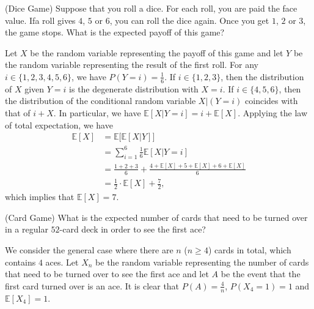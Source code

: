 \documentclass[12pt,letterpaper, onecolumn]{exam}
\begin{document}
\begin{questions}
        \question[](Dice Game) Suppose that you roll a dice. For each roll, you are paid the face value. Ifa roll gives $4$, $5$ or $6$, you can roll the dice again. Once you get $1$, $2$ or $3$, the game stops. What is the expected payoff of this game?
        \begin{solution}
            Let $X$ be the random variable representing the payoff of this game and let $Y$ be the random variable representing the result of the first roll. For any $i\in\{1,2,3,4,5,6\}$, we have $P(Y=i)=\frac{1}{6}$. If $i\in\{1,2,3\}$, then the distribution of $X$ given $Y=i$ is the degenerate distribution with $X=i$. If $i\in\{4,5,6\}$, then the distribution of the conditional random variable $X|(Y=i)$ coincides with that of $i+X$. In particular, we have $\mathbb{E}[X|Y=i]=i+\mathbb{E}[X]$. Applying the law of total expectation, we have
            \begin{align*}
                \mathbb{E}[X]&=\mathbb{E}\Big[\mathbb{E}[X|Y]\Big]\\
                &=\sum\limits_{i=1}^6\frac{1}{6}\mathbb{E}[X|Y=i]\\
                &=\frac{1+2+3}{6}+\frac{4+\mathbb{E}[X]+5+\mathbb{E}[X]+6+\mathbb{E}[X]}{6}\\
                &=\frac{1}{2}\cdot\mathbb{E}[X]+\frac{7}{2},
            \end{align*}
            which implies that $\mathbb{E}[X]=7$. 
        \end{solution}

        \question[](Card Game) What is the expected number of cards that need to be turned over in a regular $52$-card deck in order to see the first ace?
        \begin{solution}
            We consider the general case where there are $n$ ($n\ge 4$) cards in total, which contains $4$ aces. Let $X_n$ be the random variable representing the number of cards that need to be turned over to see the first ace and let $A$ be the event that the first card turned over is an ace. It is clear that $P(A)=\frac{4}{n}$, $P(X_4=1)=1$ and $\mathbb{E}[X_4]=1$. 
            

\end{solution}
\end{questions}
\end{document}
